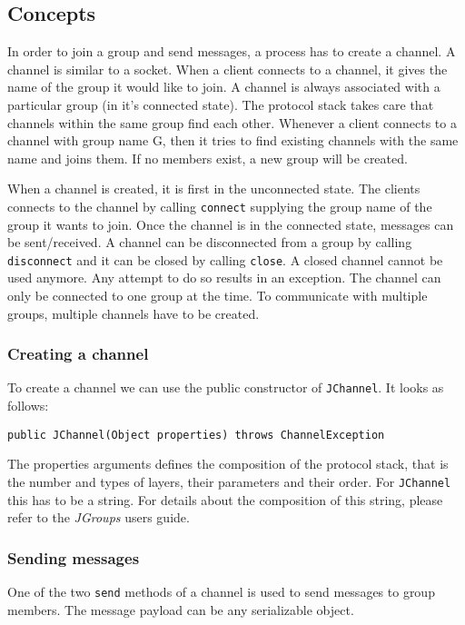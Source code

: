 \subsection{Concepts}
In order to join a group and send messages, a process has to create a channel. A channel is similar to a socket. When a client connects to a channel, it gives the name of the group it would like to join. A channel is always associated with a particular group (in it's connected state). The protocol stack takes care that channels within the same group find each other. Whenever a client connects to a channel with group name G, then it tries to find existing channels with the same name and joins them. If no members exist, a new group will be created.

When a channel is created, it is first in the unconnected state. The clients connects to the channel by calling \texttt{connect} supplying the group name of the group it wants to join. Once the channel is in the connected state, messages can be sent/received. A channel can be disconnected from a group by calling \texttt{disconnect} and it can be closed by calling \texttt{close}. A closed channel cannot be used anymore. Any attempt to do so results in an exception. The channel can only be connected to one group at the time. To communicate with multiple groups, multiple channels have to be created.

\subsubsection{Creating a channel}
To create a channel we can use the public constructor of \texttt{JChannel}. It looks as follows:

\begin{verbatim}
public JChannel(Object properties) throws ChannelException
\end{verbatim}

The properties arguments defines the composition of the protocol stack, that is the number and types of layers, their parameters and their order. For \texttt{JChannel} this has to be a string. For details about the composition of this string, please refer to the \emph{JGroups} users guide.

\subsubsection{Sending messages}
One of the two \texttt{send} methods of a channel is used to send messages to group members. The message payload can be any serializable object.

